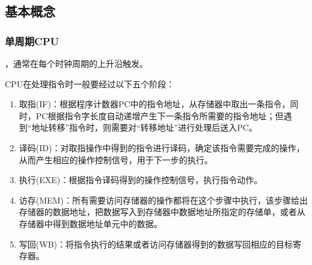 
\subsection{基本概念}
\subsubsection{单周期CPU}
，通常在每个时钟周期的上升沿触发。
\par CPU在处理指令时一般要经过以下五个阶段：
\begin{enumerate}
	\item 取指(IF)：根据程序计数器PC中的指令地址，从存储器中取出一条指令，同时，PC根据指令字长度自动递增产生下一条指令所需要的指令地址；但遇到``地址转移''指令时，则需要对``转移地址''进行处理后送入PC。
	\item 译码(ID)：对取指操作中得到的指令进行译码，确定该指令需要完成的操作，从而产生相应的操作控制信号，用于下一步的执行。
	\item 执行(EXE)：根据指令译码得到的操作控制信号，执行指令动作。
	\item 访存(MEM)：所有需要访问存储器的操作都将在这个步骤中执行，该步骤给出存储器的数据地址，把数据写入到存储器中数据地址所指定的存储单，或者从存储器中得到数据地址单元中的数据。
	\item 写回(WB)：将指令执行的结果或者访问存储器得到的数据写回相应的目标寄存器。
\end{enumerate}

